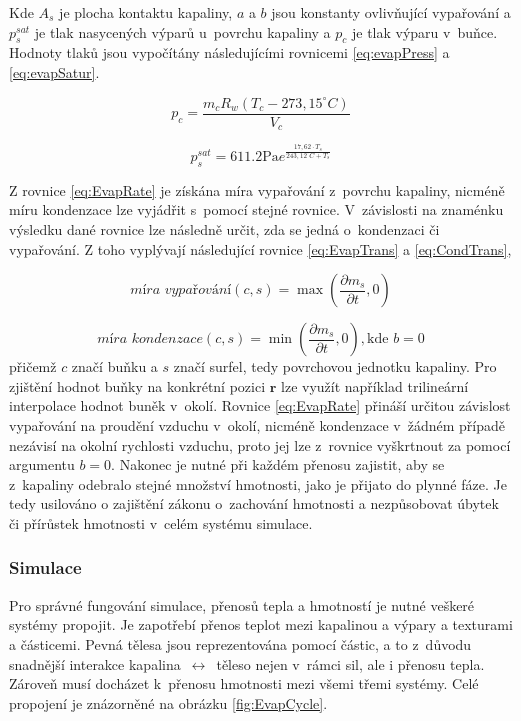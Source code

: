Kde $A_s$ je plocha kontaktu kapaliny, $a$ a $b$ jsou konstanty ovlivňující vypařování a $p_s^{sat}$ je tlak nasycených výparů u~povrchu kapaliny a $p_c$ je tlak výparu v~buňce. Hodnoty tlaků jsou vypočítány následujícími rovnicemi \ref{eq:evapPress} a \ref{eq:evapSatur}. \cite{yau1996short}

\begin{equation}
	p_c = \frac{m_c R_w(T_c - 273,15^{\circ}C)}{V_c}
	\label{eq:evapPress}
\end{equation}

\begin{equation}
	p_s^{sat} = 611.2\text{Pa} e^{\frac{17,62 \cdot T_s}{243,12^{\circ}C + T_s}}
	\label{eq:evapSatur}
\end{equation}

Z rovnice \ref{eq:EvapRate} je získána míra vypařování z~povrchu kapaliny, nicméně míru kondenzace lze vyjádřit s~pomocí stejné rovnice. V~závislosti na znaménku výsledku dané rovnice lze následně určit, zda se jedná o~kondenzaci či vypařování. Z toho vyplývají následující rovnice \ref{eq:EvapTrans} a \ref{eq:CondTrans},

\begin{equation}
	\textit{míra vypařování}(c,s) = \max\left(\frac{\partial m_s}{\partial t}, 0\right)
	\label{eq:EvapTrans}
\end{equation}

\begin{equation}
	\textit{míra kondenzace}(c,s) = \min\left(\frac{\partial m_s}{\partial t}, 0\right), \text{kde } b = 0
	\label{eq:CondTrans}
\end{equation}
přičemž $c$ značí buňku a $s$ značí surfel, tedy povrchovou jednotku kapaliny. Pro zjištění hodnot buňky na konkrétní pozici $\mathbf{r}$ lze využít například trilineární interpolace hodnot buněk v~okolí. Rovnice \ref{eq:EvapRate} přináší určitou závislost vypařování na proudění vzduchu v~okolí, nicméně kondenzace v~žádném případě nezávisí na okolní rychlosti vzduchu, proto jej lze z~rovnice vyškrtnout za pomocí argumentu $b=0$. Nakonec je nutné při každém přenosu zajistit, aby se z~kapaliny odebralo stejné množství hmotnosti, jako je přijato do plynné fáze. Je tedy usilováno o zajištění zákonu o~zachování hmotnosti a nezpůsobovat úbytek či přírůstek hmotnosti v~celém systému simulace.

\subsubsection{Simulace}
Pro správné fungování simulace, přenosů tepla a hmotností je nutné veškeré systémy propojit. Je zapotřebí přenos teplot mezi kapalinou a výpary a texturami a částicemi. Pevná tělesa jsou reprezentována pomocí částic, a to z~důvodu snadnější interakce kapalina~$\leftrightarrow$~\mbox{těleso} nejen v~rámci sil, ale i přenosu tepla. Zároveň musí docházet k~přenosu hmotnosti mezi všemi třemi systémy. Celé propojení je znázorněné na obrázku \ref{fig:EvapCycle}.

